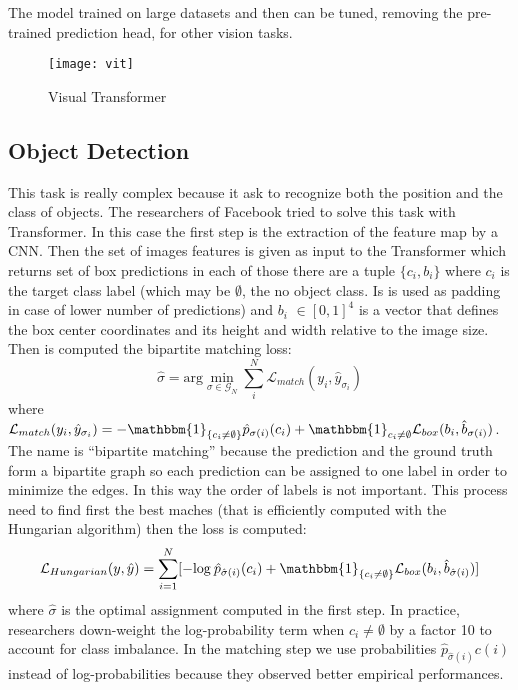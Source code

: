\documentclass[11pt]{article}
\begin{document}
The model trained on large datasets and then can be tuned, removing the pre-trained prediction head, for other vision tasks.
\begin{figure}[h]
\centerline{\texttt{[image: vit]}}
\caption{Visual Transformer} 
\label{fig}
\end{figure}

\subsection{Object Detection}
This task is really complex because it ask to recognize both the position and the class of objects. The researchers of Facebook tried to solve this task with Transformer. In this case the first step is the extraction of the feature map by a CNN. Then the set of images features is given as input to the Transformer which returns set of box predictions in each of those there are a tuple $\{c_i, b_i\}$ where $c_i$ is the target class label (which may be $\emptyset$, the no object class. Is is used as padding in case of lower number of predictions) and $b_i$ $\in [0,1]^4$ is a vector that defines the box center coordinates and its height and width relative to the image size. Then is computed the bipartite matching loss:
\begin{displaymath}
\hat{\sigma} = \textrm{arg}\min\limits_{\sigma \in \mathcal{G}_N} \sum_i ^N \mathcal{L}_{match} (y_i, \hat{y}_{\sigma_i})
\end{displaymath}
\noindent where $\mathcal{L}_{match} (y_i, \hat{y}_{\sigma_i}) = -\mathbbm{1}_{\{c_i \neq \emptyset\}} \hat{p}_{\sigma(i)}(c_i)+\mathbbm{1}_{c_i \neq \emptyset}\mathcal{L}_{box}(b_i, \hat{b}_{\sigma(i)})$. The name is ``bipartite matching'' because the prediction and the ground truth form a bipartite graph so each prediction can be assigned to one label in order to minimize the edges. In this way the order of labels is not important. This process need to find first the best maches (that is efficiently computed with the Hungarian algorithm) then the loss is computed:
\begin{displaymath}
\mathcal{L}_{Hungarian}(y, \hat{y}) = \sum_{i=1}^N [-\textrm{log} \: \hat{p}_{\hat{\sigma}(i)} (c_i) + \mathbbm{1}_{\{c_i \neq \emptyset\}}\mathcal{L}_{box}(b_i, \hat{b}_{\hat{\sigma}(i)})]
\end{displaymath}
\noindent where $\hat{\sigma}$ is the optimal assignment computed in the first step. In practice, researchers down-weight the log-probability term when $c_i \neq \emptyset$ by a factor 10 to account for class imbalance. In the matching step we use probabilities $\hat{p}_{\hat{\sigma}(i)} c(i)$ instead of log-probabilities because they observed better empirical performances.
\end{document}

